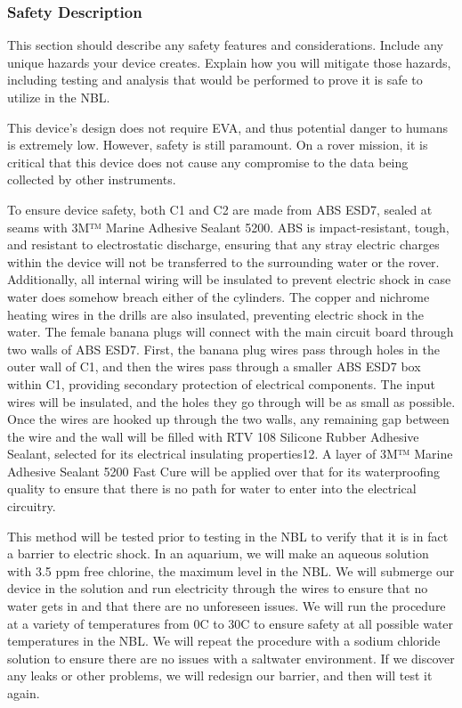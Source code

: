 \documentclass{article}
\begin{document}
\subsubsection{Safety Description}
This section should describe any safety features and considerations. Include any unique hazards your device creates. Explain how you will mitigate those hazards, including testing and analysis that would be performed to prove it is safe to utilize in the NBL.\par
This device’s design does not require EVA, and thus potential danger to humans is extremely low. However, safety is still paramount. On a rover mission, it is critical that this device does not cause any compromise to the data being collected by other instruments. \par
To ensure device safety, both C1 and C2 are made from ABS ESD7, sealed at seams with 3M™ Marine Adhesive Sealant 5200. ABS is impact-resistant, tough, and resistant to electrostatic discharge, ensuring that any stray electric charges within the device will not be transferred to the surrounding water or the rover. Additionally, all internal wiring will be insulated to prevent electric shock in case water does somehow breach either of the cylinders. The copper and nichrome heating wires in the drills are also insulated, preventing electric shock in the water. The female banana plugs will connect with the main circuit board through two walls of ABS ESD7. First, the banana plug wires pass through holes in the outer wall of C1, and then the wires pass through a smaller ABS ESD7 box within C1, providing secondary protection of electrical components. The input wires will be insulated, and the holes they go through will be as small as possible. Once the wires are hooked up through the two walls, any remaining gap between the wire and the wall will be filled with RTV 108 Silicone Rubber Adhesive Sealant, selected for its electrical insulating properties12. A layer of 3M™ Marine Adhesive Sealant 5200 Fast Cure will be applied over that for its waterproofing quality to ensure that there is no path for water to enter into the electrical circuitry.\par
This method will be tested prior to testing in the NBL to verify that it is in fact a barrier to electric shock. In an aquarium, we will make an aqueous solution with 3.5 ppm free chlorine, the maximum level in the NBL. We will submerge our device in the solution and run electricity through the wires to ensure that no water gets in and that there are no unforeseen issues. We will run the procedure at a variety of temperatures from 0C to 30C to ensure safety at all possible water temperatures in the NBL. We will repeat the procedure with a sodium chloride solution to ensure there are no issues with a saltwater environment. If we discover any leaks or other problems, we will redesign our barrier, and then will test it again.\par
\end{document}
